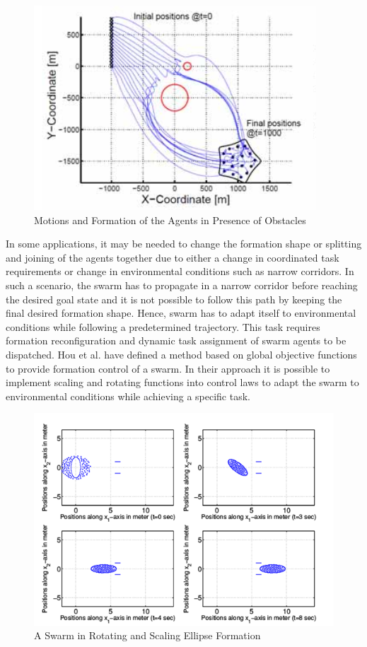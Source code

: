 \begin{figure}[H]
	\caption{Motions and Formation of the Agents in Presence of Obstacles \cite{17}} \label{samithe_obstacle}
	\centering
	\includegraphics[scale = 0.7]{samitha}
\end{figure} 

In some applications, it may be needed to change the formation shape or splitting and joining of the agents together due to either a change in coordinated task requirements or change in environmental conditions such as narrow corridors. In such a scenario, the swarm has to propagate in a narrow corridor before reaching the desired goal state and it is not possible to follow this path by keeping the final desired formation shape. Hence, swarm has to adapt itself to environmental conditions while following a predetermined trajectory. This task requires formation reconfiguration and dynamic task assignment of swarm agents to be dispatched. Hou et al. \cite{8} have defined a method based on global objective functions to provide formation control of a swarm. In their approach it is possible to implement scaling and rotating functions into control laws to adapt the swarm to environmental conditions while achieving a specific task. 

\begin{figure}[H]
	\caption{A Swarm in Rotating and Scaling Ellipse Formation \cite{8}} \label{slotine_fig_ref}
	\centering
	\includegraphics[scale = 1]{slotine}
\end{figure} 

